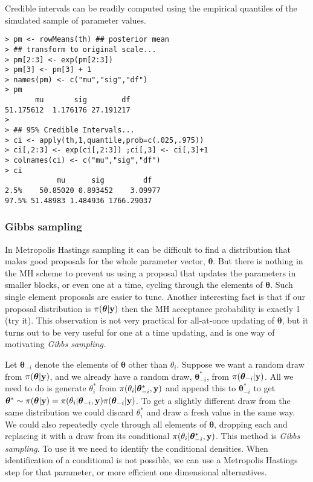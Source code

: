 \documentclass[10pt] {article}
\theoremstyle{definition}
\begin{document}
Credible intervals can be readily computed using the empirical quantiles of the simulated sample of parameter values. 
\begin{lstlisting}
> pm <- rowMeans(th) ## posterior mean
> ## transform to original scale...
> pm[2:3] <- exp(pm[2:3])
> pm[3] <- pm[3] + 1
> names(pm) <- c("mu","sig","df")
> pm
       mu       sig        df 
51.175612  1.176176 27.191217 
> 
> ## 95% Credible Intervals...
> ci <- apply(th,1,quantile,prob=c(.025,.975))
> ci[,2:3] <- exp(ci[,2:3]) ;ci[,3] <- ci[,3]+1
> colnames(ci) <- c("mu","sig","df")
> ci
            mu      sig         df
2.5%    50.85020 0.893452    3.09977
97.5% 51.48983 1.484936 1766.29037
\end{lstlisting}

\subsubsection{Gibbs sampling \label{sec:gibbs}}

In Metropolis Hastings sampling it can be difficult to find a distribution that makes good proposals for the whole parameter vector, $\bm \theta$. But there is nothing in the MH scheme to prevent us using a proposal that updates the parameters in smaller blocks, or even one at a time, cycling through the elements of $\bm \theta$. Such single element proposals are easier to tune. Another interesting fact is that if our proposal distribution is $\pi({\bm \theta}|{\bf y})$ then the MH acceptance probability is exactly 1 (try it). This observation is not very practical for all-at-once updating of $\bm\theta$, but it turns out to be very useful for one at a time updating, and is one way of motivating {\em Gibbs sampling}.  

Let ${\bm \theta}_{-i}$ denote the elements of $\bm \theta$ other than $\theta_i$. Suppose we want a random draw from $\pi({\bm \theta}|{\bf y})$, and we already have a random draw, ${\bm \theta}_{-i}^*$, from $\pi({\bm \theta}_{-i}|{\bf y})$. All we need to do is generate $\theta_i^*$ from $\pi(\theta_i|{\bm \theta}_{-i}^*,{\bf y})$ and append this to ${\bm \theta}_{-i}^*$ to get ${\bm \theta}^* \sim \pi({\bm \theta}|{\bf y}) = \pi(\theta_i|{\bm \theta}_{-i},{\bf y})\pi({\bm \theta}_{-i}|{\bf y})$. To get a slightly different draw from the same distribution we could discard $\theta_i^*$ and draw a fresh value in the same way. We could also repeatedly cycle through all elements of $\bm \theta$, dropping each and replacing it with a draw from its conditional $\pi(\theta_i|{\bm \theta}_{-i}^*,{\bf y})$. 
This method is {\em Gibbs sampling}. To use it we need to identify the conditional densities. When identification of a conditional is not possible, we can use a Metropolis Hastings step for that parameter, or more efficient one dimensional alternatives.
\end{document}
